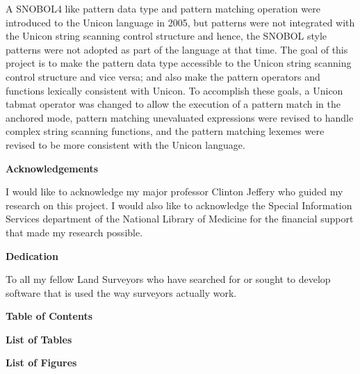 \documentclass{article}
\begin{document}
A SNOBOL4 like pattern data type and pattern matching operation were introduced to the Unicon language in 2005, but patterns were not integrated with the Unicon string scanning control structure and hence, the SNOBOL style patterns were not adopted as part of the language at that time.  The goal of this project is to make the pattern data type accessible to the Unicon string scanning control structure and vice versa; and also make the pattern operators and functions lexically consistent with Unicon.  To accomplish these goals, a Unicon tabmat operator was changed to allow the execution of a pattern match in the anchored mode, pattern matching unevaluated expressions were revised to handle complex string scanning functions, and the pattern matching lexemes were revised to be more consistent with the Unicon language.

\pagebreak

\begin{center}
\textbf{Acknowledgements}
\end{center}
I would like to acknowledge my major professor Clinton Jeffery who guided my research on this project.  I would also like to acknowledge the Special Information Services department of the National Library of Medicine for the financial support that made my research possible.

\pagebreak

\begin{center}
\textbf{Dedication}
\end{center}
To all my fellow Land Surveyors who have searched for or sought to develop software that is used the way surveyors actually work. 

\pagebreak
\linespread{1}
\begin{center}
\textbf{Table of Contents}
\end{center}
\tableofcontents

\pagebreak
\begin{center}
\textbf{List of Tables}
\end{center}
\listoftables
	
\pagebreak
\begin{center}
\textbf{List of Figures}
\end{center}
\listoffigures

\pagebreak
\end{document}
